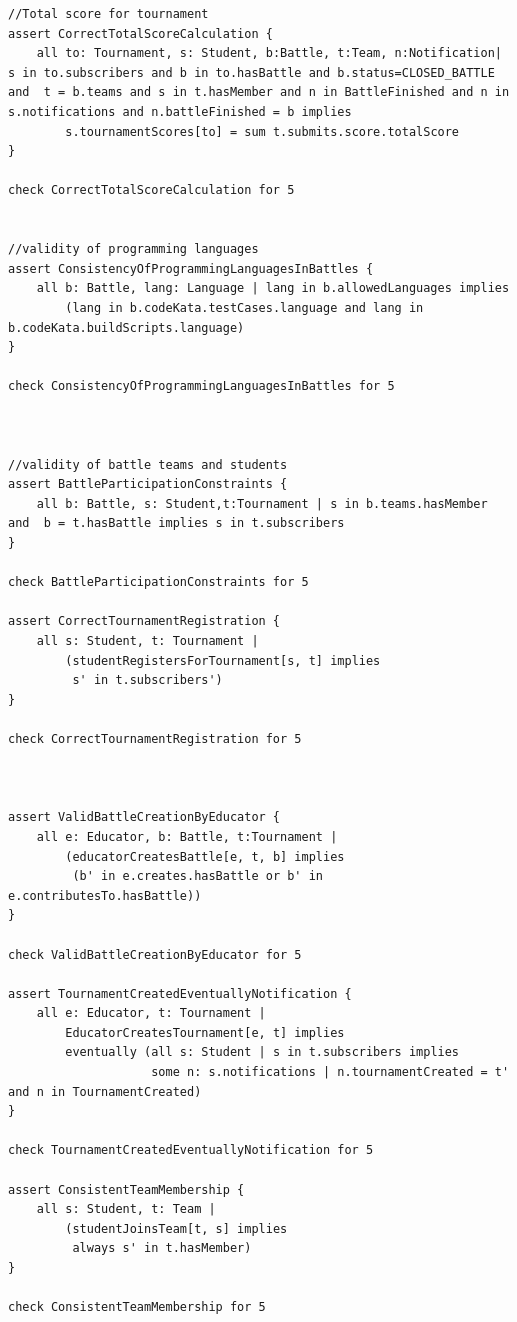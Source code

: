\begin{lstlisting}[language=alloy]
//Total score for tournament 
assert CorrectTotalScoreCalculation {
    all to: Tournament, s: Student, b:Battle, t:Team, n:Notification| s in to.subscribers and b in to.hasBattle and b.status=CLOSED_BATTLE  and  t = b.teams and s in t.hasMember and n in BattleFinished and n in s.notifications and n.battleFinished = b implies
        s.tournamentScores[to] = sum t.submits.score.totalScore
}

check CorrectTotalScoreCalculation for 5


//validity of programming languages
assert ConsistencyOfProgrammingLanguagesInBattles {
    all b: Battle, lang: Language | lang in b.allowedLanguages implies
        (lang in b.codeKata.testCases.language and lang in b.codeKata.buildScripts.language)
}

check ConsistencyOfProgrammingLanguagesInBattles for 5



//validity of battle teams and students
assert BattleParticipationConstraints {
    all b: Battle, s: Student,t:Tournament | s in b.teams.hasMember and  b = t.hasBattle implies s in t.subscribers
}

check BattleParticipationConstraints for 5
 
assert CorrectTournamentRegistration {
    all s: Student, t: Tournament | 
        (studentRegistersForTournament[s, t] implies 
         s' in t.subscribers')
}

check CorrectTournamentRegistration for 5



assert ValidBattleCreationByEducator {
    all e: Educator, b: Battle, t:Tournament | 
        (educatorCreatesBattle[e, t, b] implies 
         (b' in e.creates.hasBattle or b' in e.contributesTo.hasBattle))
}

check ValidBattleCreationByEducator for 5 

assert TournamentCreatedEventuallyNotification {
    all e: Educator, t: Tournament | 
        EducatorCreatesTournament[e, t] implies 
        eventually (all s: Student | s in t.subscribers implies 
                    some n: s.notifications | n.tournamentCreated = t' and n in TournamentCreated)
}

check TournamentCreatedEventuallyNotification for 5

assert ConsistentTeamMembership {
    all s: Student, t: Team | 
        (studentJoinsTeam[t, s] implies 
         always s' in t.hasMember)
}

check ConsistentTeamMembership for 5



\end{lstlisting}
